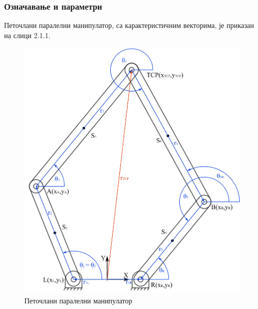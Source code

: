 \documentclass[12pt]{article}
\begin{document}
\subsubsection{Означавање и параметри}
Петочлани паралелни манипулатор, са карактеристичним векторима, је приказан на слици 2.1.1.
\begin{figure}[H]
    \centering
    \includegraphics[width=12cm]{figures/5bar.jpg}
    \caption{Петочлани паралелни манипулатор}
    \label{fig:5bar_manipulator}
\end{figure}
\end{document}
